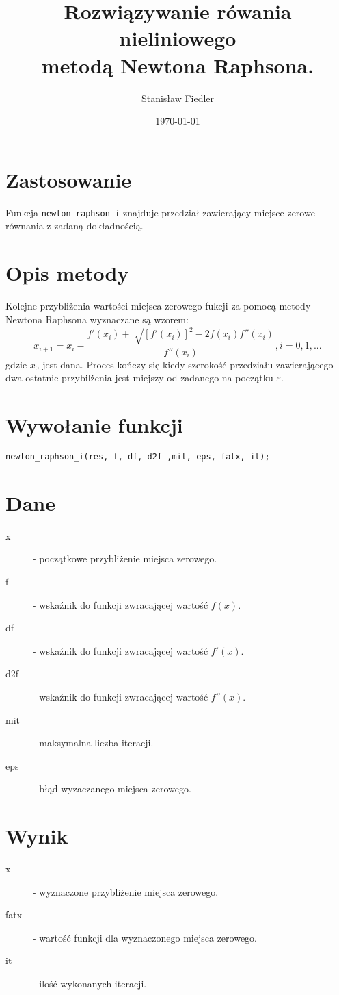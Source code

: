 \documentclass[11pt]{article}
\title{%
    Rozwiązywanie rówania nieliniowego \\
    metodą Newtona Raphsona.}
\author{ Stanisław Fiedler }
\date{\today}
\begin{document}
\maketitle	

\section{Zastosowanie}
    Funkcja \verb|newton_raphson_i| znajduje przedział zawierający miejsce zerowe równania z zadaną dokładnością.
\section{Opis metody}
    Kolejne przybliżenia wartości miejsca zerowego fukcji za pomocą metody Newtona Raphsona wyznaczane są wzorem:
    $$x_{i+1} = x_i - \frac{f'(x_i)+\sqrt[]{[f'(x_i)]^2-2f(x_i)f''(x_i)}}{f''(x_i)}, i = 0, 1, ...$$
    gdzie $x_0$ jest dana. 
    Proces kończy się kiedy szerokość przedziału zawierającego dwa ostatnie przybilżenia jest miejszy od zadanego na początku $\varepsilon$.
\section{Wywołanie funkcji}
    \verb|newton_raphson_i(res, f, df, d2f ,mit, eps, fatx, it);|
\section{Dane}
    \begin{description}
        \item[x] - początkowe przybliżenie miejsca zerowego.
        \item[f] - wskaźnik do funkcji zwracającej wartość $f(x)$.
        \item[df] - wskaźnik do funkcji zwracającej wartość $f'(x)$.
        \item[d2f] - wskaźnik do funkcji zwracającej wartość $f''(x)$.
        \item[mit] - maksymalna liczba iteracji.
        \item[eps] - błąd wyzaczanego miejsca zerowego.
    \end{description}
\section{Wynik}
    \begin{description}
        \item[x] - wyznaczone przybliżenie miejsca zerowego.
        \item[fatx] - wartość funkcji dla wyznaczonego miejsca zerowego.
        \item[it] - ilość wykonanych iteracji.
    \end{description}
\end{document}

